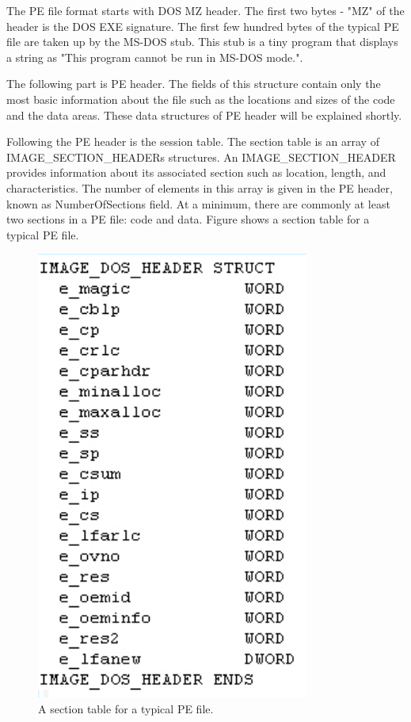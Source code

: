 The PE file format starts with DOS MZ header. The first two bytes - "MZ" of the header is the DOS EXE signature. The first few hundred bytes of the typical PE file are taken up by the MS-DOS stub. This stub is a tiny program that displays a string as "This program cannot be run in MS-DOS mode.". 

The following part is PE header. The fields of this structure contain only the most basic information about the file such as the locations and sizes of the code and the data areas. These data structures of PE header will be explained shortly.

Following the PE header is the session table. The section table is an array of IMAGE\_SECTION\_HEADERs structures. An IMAGE\_SECTION\_HEADER provides information about its associated section such as location, length, and characteristics. The number of elements in this array is given in the PE header, known as NumberOfSections field. At a minimum, there are commonly at least two sections in a PE file: code and data. Figure  shows a section table for a typical PE file.

\begin{figure}[h!]
\centering
\includegraphics[width=0.8\textwidth]{graph/dosHeaderStructure.png}
\caption{A section table for a typical PE file.}
\label{fig:pefiles}
\end{figure}

